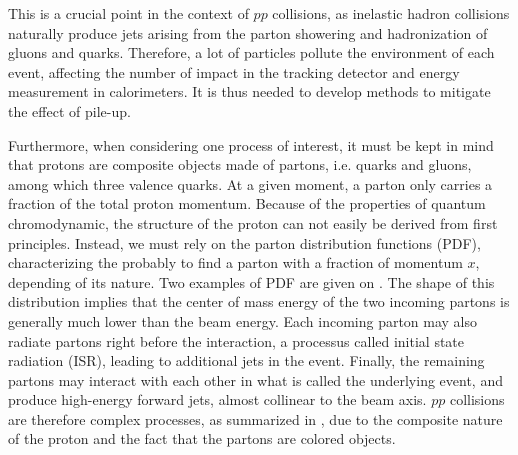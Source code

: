 
    This is a crucial point in the context of $pp$ collisions, as inelastic hadron collisions
    naturally produce jets arising from the parton showering and hadronization of gluons
    and quarks. Therefore, a lot of particles pollute the environment of each event, affecting the
    number of impact in the tracking detector and energy measurement in calorimeters.
    It is thus needed to develop methods to mitigate the effect of pile-up.

    Furthermore, when considering one process of interest, it must be kept in mind that
    protons are composite objects made of partons, i.e. quarks and gluons, among which three
    valence quarks. At a given moment, a parton only carries a fraction of the total
    proton momentum. Because of the properties of quantum chromodynamic, the structure
    of the proton can not easily be derived from first principles. Instead, we must rely
    on the parton distribution functions (PDF), characterizing the probably to find a
    parton with a fraction of momentum $x$, depending of its nature. Two examples of PDF
    are given on . The shape of this
    distribution implies that the center of mass energy of the two incoming partons is
    generally much lower than the beam energy.  Each incoming parton may also radiate partons
    right before the interaction, a processus called initial state radiation (ISR), leading to
    additional jets in the event. Finally, the remaining partons may interact with each
    other in what is called the underlying event, and produce high-energy forward jets, almost
    collinear to the beam axis.  $pp$ collisions
    are therefore complex processes, as summarized in , due
    to the composite nature of the proton and the fact that the partons are colored objects.


